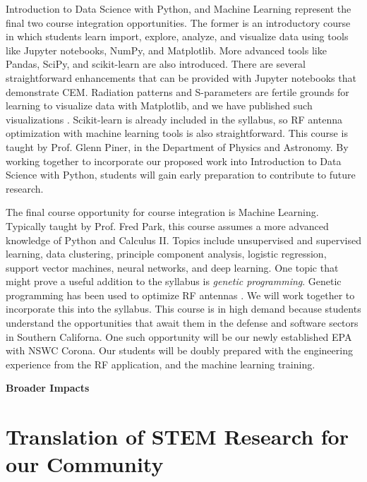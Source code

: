 \documentclass[11pt]{amsart}
\begin{document}
Introduction to Data Science with Python, and Machine Learning represent the final two course integration opportunities.  The former is an introductory course in which students learn import, explore, analyze, and visualize data using tools like Jupyter notebooks, NumPy, and Matplotlib.  More advanced tools like Pandas, SciPy, and scikit-learn are also introduced.  There are several straightforward enhancements that can be provided with Jupyter notebooks that demonstrate CEM.  Radiation patterns and S-parameters are fertile grounds for learning to visualize data with Matplotlib, and we have published such visualizations \cite{electronics10040415}.  Scikit-learn is already included in the syllabus, so RF antenna optimization with machine learning tools is also straightforward.  This course is taught by Prof. Glenn Piner, in the Department of Physics and Astronomy.  By working together to incorporate our proposed work into Introduction to Data Science with Python, students will gain early preparation to contribute to future research.  

The final course opportunity for course integration is Machine Learning.  Typically taught by Prof. Fred Park, this course assumes a more advanced knowledge of Python and Calculus II.  Topics include unsupervised and supervised learning, data clustering, principle component analysis, logistic regression, support vector machines, neural networks, and deep learning.  One topic that might prove a useful addition to the syllabus is \textit{genetic programming}.  Genetic programming has been used to optimize RF antennas \cite{2016MsT.........58S,genetic}.  We will work together to incorporate this into the syllabus.  This course is in high demand because students understand the opportunities that await them in the defense and software sectors in Southern Californa.  One such opportunity will be our newly established EPA with NSWC Corona.  Our students will be doubly prepared with the engineering experience from the RF application, and the machine learning training.

\linespacing
\centerline{\bf \Large Broader Impacts}
\linespacing

\section{Translation of STEM Research for our Community}
\label{sec:broad}
\end{document}
